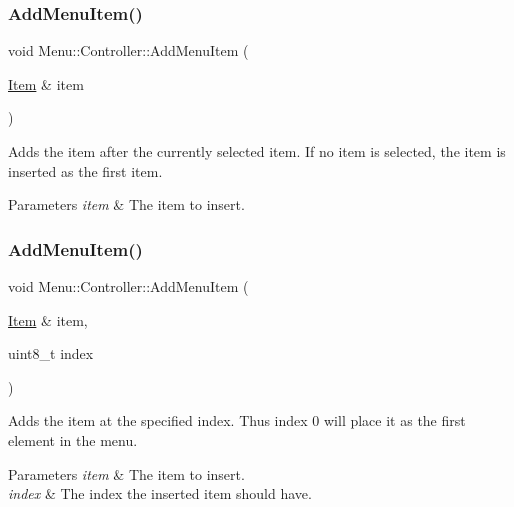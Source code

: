 \subsubsection{\texorpdfstring{Add\+Menu\+Item()}{AddMenuItem()}\hspace{0.1cm}{\footnotesize\ttfamily [1/2]}}
{\footnotesize\ttfamily void Menu\+::\+Controller\+::\+Add\+Menu\+Item (\begin{DoxyParamCaption}\item[{\hyperlink{struct_menu_1_1_item}{Item} \&}]{item }\end{DoxyParamCaption})}

Adds the item after the currently selected item. If no item is selected, the item is inserted as the first item. 
\begin{DoxyParams}{Parameters}
{\em item} & The item to insert. \\
\hline
\end{DoxyParams}
\hypertarget{class_menu_1_1_controller_aed44f5a995f14772d8d99f663942ab30}{}\label{class_menu_1_1_controller_aed44f5a995f14772d8d99f663942ab30} 
\subsubsection{\texorpdfstring{Add\+Menu\+Item()}{AddMenuItem()}\hspace{0.1cm}{\footnotesize\ttfamily [2/2]}}
{\footnotesize\ttfamily void Menu\+::\+Controller\+::\+Add\+Menu\+Item (\begin{DoxyParamCaption}\item[{\hyperlink{struct_menu_1_1_item}{Item} \&}]{item,  }\item[{uint8\+\_\+t}]{index }\end{DoxyParamCaption})}

Adds the item at the specified index. Thus index 0 will place it as the first element in the menu. 
\begin{DoxyParams}{Parameters}
{\em item} & The item to insert. \\
\hline
{\em index} & The index the inserted item should have. \\
\hline
\end{DoxyParams}
\hypertarget{class_menu_1_1_controller_a9a4c0ccd822f485834ec9abb4133a059}{}\label{class_menu_1_1_controller_a9a4c0ccd822f485834ec9abb4133a059} 
